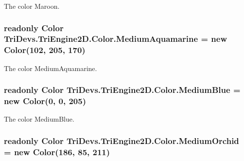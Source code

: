 The color Maroon. 

\hypertarget{struct_tri_devs_1_1_tri_engine2_d_1_1_color_aa8bcde16a09e3e797fc0fc98b2bc1b94}{
\subsubsection[{Medium\-Aquamarine}]{\setlength{\rightskip}{0pt plus 5cm}readonly {\bf Color} Tri\-Devs.\-Tri\-Engine2\-D.\-Color.\-Medium\-Aquamarine = new {\bf Color}(102, 205, 170)\hspace{0.3cm}{\ttfamily [static]}}}\label{struct_tri_devs_1_1_tri_engine2_d_1_1_color_aa8bcde16a09e3e797fc0fc98b2bc1b94}


The color Medium\-Aquamarine. 

\hypertarget{struct_tri_devs_1_1_tri_engine2_d_1_1_color_a9b6d2c2a2a25e0a116abd8433df80c1f}{
\subsubsection[{Medium\-Blue}]{\setlength{\rightskip}{0pt plus 5cm}readonly {\bf Color} Tri\-Devs.\-Tri\-Engine2\-D.\-Color.\-Medium\-Blue = new {\bf Color}(0, 0, 205)\hspace{0.3cm}{\ttfamily [static]}}}\label{struct_tri_devs_1_1_tri_engine2_d_1_1_color_a9b6d2c2a2a25e0a116abd8433df80c1f}


The color Medium\-Blue. 

\hypertarget{struct_tri_devs_1_1_tri_engine2_d_1_1_color_aaed02ff71016d54a7b8b6a692d0d0112}{
\subsubsection[{Medium\-Orchid}]{\setlength{\rightskip}{0pt plus 5cm}readonly {\bf Color} Tri\-Devs.\-Tri\-Engine2\-D.\-Color.\-Medium\-Orchid = new {\bf Color}(186, 85, 211)\hspace{0.3cm}{\ttfamily [static]}}}\label{struct_tri_devs_1_1_tri_engine2_d_1_1_color_aaed02ff71016d54a7b8b6a692d0d0112}


